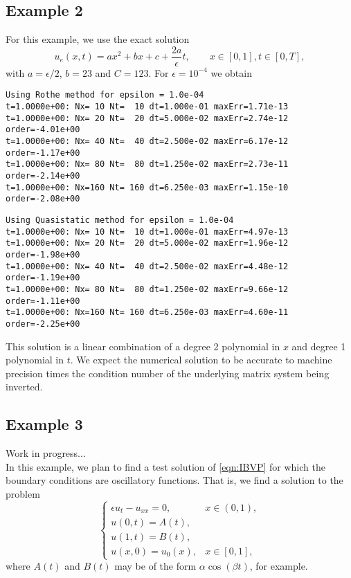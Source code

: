 \documentclass[11pt]{article}
\numberwithin{equation}{section}
\newcommand{\beq}{\begin{equation}}
\newcommand{\eeq}{\end{equation}}
\newcommand{\note}[1]{{\color{red} #1}}
\begin{document}
\subsection{Example 2}
For this example, we use the exact solution 
\beq
u_e(x,t) = ax^2 + bx + c + \frac{2a}{\epsilon} t, \qquad x \in [0,1], t\in[0,T], 
\eeq
with  $a = \epsilon/2$, $b = 23$ and $C = 123$. 
For $\epsilon = 10^{-4}$ we obtain
\begin{footnotesize}
\begin{Verbatim}[frame = single]
Using Rothe method for epsilon = 1.0e-04
t=1.0000e+00: Nx= 10 Nt=  10 dt=1.000e-01 maxErr=1.71e-13
t=1.0000e+00: Nx= 20 Nt=  20 dt=5.000e-02 maxErr=2.74e-12 order=-4.01e+00
t=1.0000e+00: Nx= 40 Nt=  40 dt=2.500e-02 maxErr=6.17e-12 order=-1.17e+00
t=1.0000e+00: Nx= 80 Nt=  80 dt=1.250e-02 maxErr=2.73e-11 order=-2.14e+00
t=1.0000e+00: Nx=160 Nt= 160 dt=6.250e-03 maxErr=1.15e-10 order=-2.08e+00
\end{Verbatim}
\end{footnotesize}
\begin{footnotesize}
\begin{Verbatim}[frame = single]
Using Quasistatic method for epsilon = 1.0e-04
t=1.0000e+00: Nx= 10 Nt=  10 dt=1.000e-01 maxErr=4.97e-13
t=1.0000e+00: Nx= 20 Nt=  20 dt=5.000e-02 maxErr=1.96e-12 order=-1.98e+00
t=1.0000e+00: Nx= 40 Nt=  40 dt=2.500e-02 maxErr=4.48e-12 order=-1.19e+00
t=1.0000e+00: Nx= 80 Nt=  80 dt=1.250e-02 maxErr=9.66e-12 order=-1.11e+00
t=1.0000e+00: Nx=160 Nt= 160 dt=6.250e-03 maxErr=4.60e-11 order=-2.25e+00
\end{Verbatim}
\end{footnotesize}
This solution is a linear combination of a degree 2 polynomial in $x$ and degree 1 polynomial in $t$. We expect the numerical solution to be accurate to machine precision times the condition number of the underlying matrix system being inverted. 

\subsection{Example 3}
\note{Work in progress...}\\
In this example, we plan to find a test solution of \eqref{eqn:IBVP} for which the boundary conditions are oscillatory functions. That is, we find a solution to the problem 
\beq\label{eq:heatBCs}
\begin{cases}
\epsilon u_{t} - u_{xx} = 0, & x\in(0,1),\\
u(0,t) = A(t),\\
u(1,t) = B(t), \\
u(x, 0) = u_0(x), & x\in [0,1], 
\end{cases}
\eeq
where $A(t)$ and $B(t)$ may be of the form $\alpha \cos(\beta t)$, for example. \\
\end{document}
